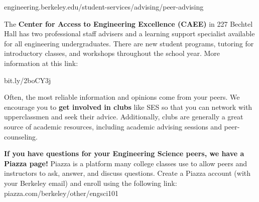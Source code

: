 {\selectfont engineering.berkeley.edu/student-services/advising/peer-advising}

The \textbf{Center for Access to Engineering Excellence (CAEE)} in 227 Bechtel Hall has two professional staff advisers and a learning support specialist available for all engineering undergraduates. There are new student programs, tutoring for introductory classes, and workshops throughout the school year. More information at this link:

{\selectfont bit.ly/2boCY3j}

Often, the most reliable information and opinions come from your peers. We encourage you to \textbf{get involved in clubs} like SES so that you can network with upperclassmen and seek their advice. Additionally, clubs are generally a great source of academic resources, including academic advising sessions and peer-counseling.

\textbf{If you have questions for your Engineering Science peers, we have a Piazza page!} Piazza is a platform many college classes use to allow peers and instructors to ask, answer, and discuss questions. Create a Piazza account (with your Berkeley email) and enroll using the following link: {\selectfont piazza.com/berkeley/other/engsci101}

